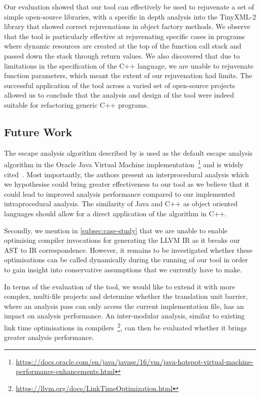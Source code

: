 \documentclass{mpaper}
\begin{document}
    Our evaluation showed that our tool can effectively be used to rejuvenate a set of simple open-source libraries, with a specific in depth analysis into the TinyXML-2 library that showed correct rejuvenations in object factory methods. 
    We observe that the tool is particularly effective at rejuvenating specific cases in programs where dynamic resources are created at the top of the function call stack and passed down the stack through return values. 
    We also discovered that due to limitations in the specification of the C++ language, we are unable to rejuvenate function parameters, which meant the extent of our rejuvenation had limits.
    The successful application of the tool across a varied set of open-source projects allowed us to conclude that the analysis and design of the tool were indeed suitable for refactoring generic C++ programs. 
    
    \subsection{Future Work}
    
    The escape analysis algorithm described by \citet{Choi1999} is used as the default escape analysis algorithm in the Oracle Java Virtual Machine implementation~\footnote{\url{https://docs.oracle.com/en/java/javase/16/vm/java-hotspot-virtual-machine-performance-enhancements.html}} and is widely cited~\cite{Wang2020, Stadler2014}.
    Most importantly, the authors present an interprocedural analysis which we hypothesise could bring greater effectiveness to our tool as we believe that it could lead to improved analysis performance compared to our implemented intraprocedural analysis. 
    The similarity of Java and C++ as object oriented languages should allow for a direct application of the algorithm in C++.
    
    Secondly, we mention in \autoref{subsec:case-study} that we are unable to enable optimising compiler invocations for generating the LLVM IR as it breaks our AST to IR correspondence. 
    However, it remains to be investigated whether these optimisations can be called dynamically during the running of our tool in order to gain insight into conservative assumptions that we currently have to make. 
    
    In terms of the evaluation of the tool, we would like to extend it with more complex, multi-file projects and determine whether the translation unit barrier, where an analysis pass can only access the current implementation file, has an impact on analysis performance.
    An inter-modular analysis, similar to existing link time optimisations in compilers~\footnote{\url{https://llvm.org/docs/LinkTimeOptimization.html}}, can then be evaluated whether it brings greater analysis performance. 
    
\end{document}
